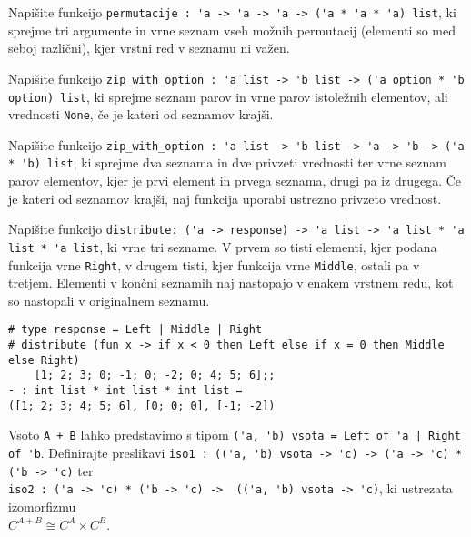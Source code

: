 \documentclass[arhiv]{../izpit}
\begin{document}
	


\naloga

\podnaloga
Napišite funkcijo \verb|permutacije : 'a -> 'a -> 'a -> ('a * 'a * 'a) list|, ki sprejme tri argumente in vrne seznam vseh možnih permutacij (elementi so med seboj različni), kjer vrstni red v seznamu ni važen.

\podnaloga
 Napišite funkcijo \verb|zip_with_option : 'a list -> 'b list -> ('a option * 'b option) list|, ki sprejme seznam parov in vrne parov istoležnih elementov, ali vrednosti \verb|None|, če je kateri od seznamov krajši.
  
\podnaloga
 Napišite funkcijo \verb|zip_with_option : 'a list -> 'b list -> 'a -> 'b -> ('a * 'b) list|, ki sprejme dva seznama in dve privzeti vrednosti ter vrne seznam parov elementov, kjer je prvi element in prvega seznama, drugi pa iz drugega. Če je kateri od seznamov krajši, naj funkcija uporabi ustrezno privzeto vrednost.

\podnaloga
 Napišite funkcijo \verb|distribute: ('a -> response) -> 'a list -> 'a list * 'a list * 'a list|, ki vrne tri sezname. V prvem so tisti elementi, kjer podana funkcija vrne \verb|Right|, v drugem tisti, kjer funkcija vrne \verb|Middle|, ostali pa v tretjem. Elementi v končni seznamih naj nastopajo v enakem vrstnem redu, kot so nastopali  v originalnem seznamu.

\begin{verbatim}
# type response = Left | Middle | Right
# distribute (fun x -> if x < 0 then Left else if x = 0 then Middle else Right) 
    [1; 2; 3; 0; -1; 0; -2; 0; 4; 5; 6];;
- : int list * int list * int list =
([1; 2; 3; 4; 5; 6], [0; 0; 0], [-1; -2])
\end{verbatim}

\podnaloga
Vsoto \verb|A + B| lahko predstavimo s tipom \verb$('a, 'b) vsota = Left of 'a | Right of 'b$. Definirajte preslikavi \verb|iso1 : (('a, 'b) vsota -> 'c) -> ('a -> 'c) * ('b -> 'c)| ter \\{\verb|iso2 : ('a -> 'c) * ('b -> 'c) ->  (('a, 'b) vsota -> 'c)|}, ki ustrezata izomorfizmu \\${C^{A + B} \cong C^A \times C^B}$.


\naloga
\end{document}
